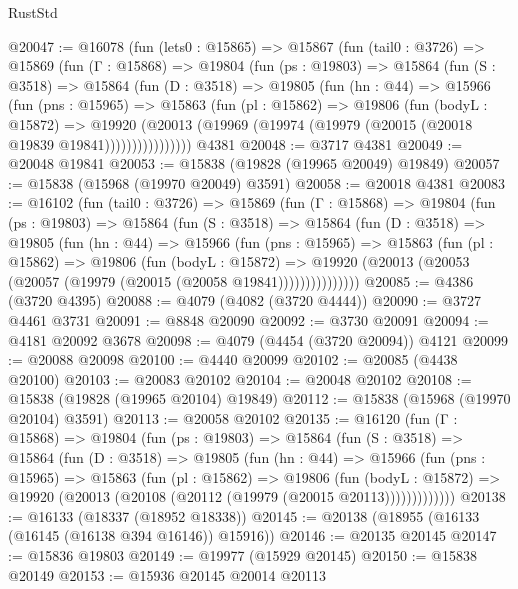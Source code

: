 \begin{lexlean}{RustStd}
\begin{coremodule}
@20047 := @16078
    (fun (lets0 : @15865) =>
    @15867
      (fun (tail0 : @3726) =>
      @15869
        (fun (Γ : @15868) =>
        @19804
          (fun (ps : @19803) =>
          @15864
            (fun (S : @3518) =>
            @15864
              (fun (D : @3518) =>
              @19805
                (fun (hn : @44) =>
                @15966
                  (fun (pns : @15965) =>
                  @15863
                    (fun (pl : @15862) =>
                    @19806
                      (fun (bodyL : @15872) =>
                      @19920
                        (@20013
                          (@19969 (@19974 (@19979 (@20015 (@20018 @19839 @19841))))))))))))))))
    @4381
@20048 := @3717 @4381
@20049 := @20048 @19841
@20053 := @15838 (@19828 (@19965 @20049) @19849)
@20057 := @15838 (@15968 (@19970 @20049) @3591)
@20058 := @20018 @4381
@20083 := @16102
    (fun (tail0 : @3726) =>
    @15869
      (fun (Γ : @15868) =>
      @19804
        (fun (ps : @19803) =>
        @15864
          (fun (S : @3518) =>
          @15864
            (fun (D : @3518) =>
            @19805
              (fun (hn : @44) =>
              @15966
                (fun (pns : @15965) =>
                @15863
                  (fun (pl : @15862) =>
                  @19806
                    (fun (bodyL : @15872) =>
                    @19920 (@20013 (@20053 (@20057 (@19979 (@20015 (@20058 @19841)))))))))))))))
@20085 := @4386 (@3720 @4395)
@20088 := @4079 (@4082 (@3720 @4444))
@20090 := @3727 @4461 @3731
@20091 := @8848 @20090
@20092 := @3730 @20091
@20094 := @4181 @20092 @3678
@20098 := @4079 (@4454 (@3720 @20094)) @4121
@20099 := @20088 @20098
@20100 := @4440 @20099
@20102 := @20085 (@4438 @20100)
@20103 := @20083 @20102
@20104 := @20048 @20102
@20108 := @15838 (@19828 (@19965 @20104) @19849)
@20112 := @15838 (@15968 (@19970 @20104) @3591)
@20113 := @20058 @20102
@20135 := @16120
    (fun (Γ : @15868) =>
    @19804
      (fun (ps : @19803) =>
      @15864
        (fun (S : @3518) =>
        @15864
          (fun (D : @3518) =>
          @19805
            (fun (hn : @44) =>
            @15966
              (fun (pns : @15965) =>
              @15863
                (fun (pl : @15862) =>
                @19806
                  (fun (bodyL : @15872) =>
                  @19920 (@20013 (@20108 (@20112 (@19979 (@20015 @20113)))))))))))))
@20138 := @16133 (@18337 (@18952 @18338))
@20145 := @20138 (@18955 (@16133 (@16145 (@16138 @394 @16146)) @15916))
@20146 := @20135 @20145
@20147 := @15836 @19803
@20149 := @19977 (@15929 @20145)
@20150 := @15838 @20149
@20153 := @15936 @20145 @20014 @20113

\end{coremodule}
\end{lexlean}
